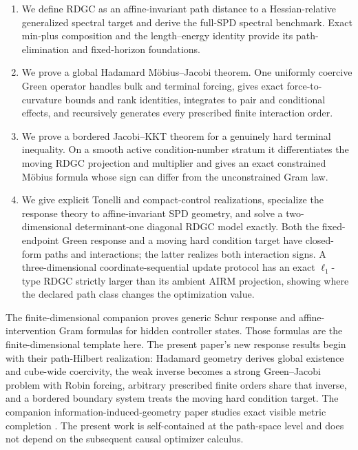 \begin{enumerate}[leftmargin=*,itemsep=0.25em]
  \item We define RDGC as an affine-invariant path distance to a
  Hessian-relative generalized spectral target and derive the
  full-SPD spectral benchmark.  Exact min-plus composition and the
  length--energy identity provide its path-elimination and fixed-horizon
  foundations.

  \item We prove a global Hadamard M\"obius--Jacobi theorem.  One uniformly
  coercive Green operator handles bulk and terminal forcing, gives exact
  force-to-curvature bounds and rank identities, integrates to pair and
  conditional effects, and recursively generates every prescribed finite
  interaction order.

  \item We prove a bordered Jacobi--KKT theorem for a genuinely hard terminal
  inequality.  On a smooth active condition-number stratum it differentiates
  the moving RDGC projection and multiplier and gives an exact constrained
  M\"obius formula whose sign can differ from the unconstrained Gram law.

  \item We give explicit Tonelli and compact-control realizations, specialize
  the response theory to affine-invariant SPD geometry, and solve a
  two-dimensional determinant-one diagonal RDGC model exactly.  Both the
  fixed-endpoint Green response and a moving hard condition target have
  closed-form paths and interactions; the latter realizes both interaction
  signs.  A three-dimensional coordinate-sequential update protocol has an
  exact \(\ell_1\)-type RDGC strictly larger than its ambient AIRM projection,
  showing where the declared path class changes the optimization value.
\end{enumerate}

The finite-dimensional companion \cite{li2026optimizationgeometrodynamics}
proves generic Schur response and affine-intervention Gram formulas for hidden
controller states.  Those
formulas are the finite-dimensional template here.  The present paper's new
response results begin
with their path-Hilbert realization: Hadamard geometry derives global
existence and cube-wide coercivity, the weak inverse becomes a strong
Green--Jacobi problem with Robin forcing, arbitrary prescribed finite orders
share that inverse, and a bordered boundary system treats the moving hard
condition target.  The companion
information-induced-geometry paper studies exact visible metric completion
\cite{li2026informationinducedgeometry}.  The present work is
self-contained at the path-space level and does not depend on the subsequent
causal optimizer calculus.

